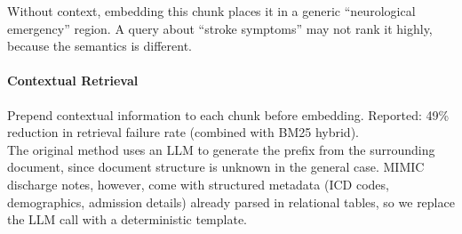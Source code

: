 \documentclass[11pt,a4paper]{article}
\begin{document}
Without context, embedding this chunk places it in a generic ``neurological emergency'' region.  A query about ``stroke symptoms'' may not rank it highly, because the semantics is different.

\paragraph{Contextual Retrieval~\cite{anthropic2024contextual}}
Prepend contextual information to each chunk before embedding. Reported: 49\% reduction in retrieval failure rate (combined with BM25 hybrid).\\
The original method uses an LLM to generate the prefix from the surrounding document, since document structure is unknown in the general case.  MIMIC discharge notes, however, come with structured metadata (ICD codes, demographics, admission details) already parsed in relational tables, so we replace the LLM call with a deterministic template.





\end{document}
